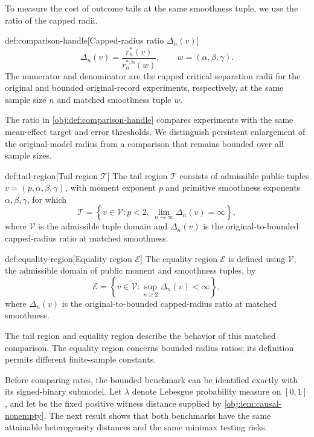 \documentclass[11pt]{article}
\begin{document}
To measure the cost of outcome tails at the same smoothness tuple, we use the ratio of the capped radii.

\begin{definitionv}{def:comparison-handle}[Capped-radius ratio $\Delta_n(v)$]
\[
\Delta_n(v)=\frac{r_n^*(v)}{r_n^{*,\mathrm b}(w)},
\qquad w=(\alpha,\beta,\gamma).
\]
The numerator and denominator are the capped critical separation radii for the original and bounded original-record experiments, respectively, at the same sample size \(n\) and matched smoothness tuple \(w\).
\end{definitionv}

The ratio  in \cref{obj:def:comparison-handle} compares experiments with the same mean-effect target and error thresholds. We distinguish persistent enlargement of the original-model radius from a comparison that remains bounded over all sample sizes.

\begin{definitionv}{def:tail-region}[Tail region \(\mathcal T\)]
The tail region \(\mathcal T\) consists of admissible public tuples \(v=(p,\alpha,\beta,\gamma)\), with moment exponent \(p\) and primitive smoothness exponents \(\alpha,\beta,\gamma\), for which
\[
\mathcal T
=
\left\{
v\in\mathcal V:
p<2,\ 
\lim_{n\to\infty}\Delta_n(v)=\infty
\right\},
\]
where \(\mathcal V\) is the admissible tuple domain and \(\Delta_n(v)\) is the original-to-bounded capped-radius ratio at matched smoothness.
\end{definitionv}

\begin{definitionv}{def:equality-region}[Equality region \(\mathcal E\)]
The equality region \(\mathcal E\) is defined using \(\mathcal V\), the admissible domain of public moment and smoothness tuples, by
\[
\mathcal E
=
\left\{
v\in\mathcal V:
\sup_{n\ge 2}\Delta_n(v)<\infty
\right\},
\]
where \(\Delta_n(v)\) is the original-to-bounded capped-radius ratio at matched smoothness.
\end{definitionv}

The tail region  and equality region  describe the behavior of this matched comparison. The equality region concerns bounded radius ratios; its definition permits different finite-sample constants.

Before comparing rates, the bounded benchmark can be identified exactly with its signed-binary submodel. Let \(\lambda\) denote Lebesgue probability measure on \([0,1]\), and let  be the fixed positive witness distance supplied by \cref{obj:lem:causal-nonempty}. The next result shows that both benchmarks have the same attainable heterogeneity distances and the same minimax testing risks.
\end{document}

